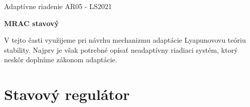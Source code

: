 \documentclass[a4paper, 10pt, ]{article}
\def\oznacenieCasti{AR05 - LS2021}
\begin{document}
\lstset{%
style=mystyle,
rangebeginprefix=\#\#\#\ cellB\ ,%
rangebeginsuffix=\ \#\#\#,%
rangeendprefix=\#\#\#\ cellE\ ,%
rangeendsuffix=\ \#\#\#,%
includerangemarker=false,
}




\fontsize{12pt}{22pt}\selectfont

\centerline{\textsf{Adaptívne riadenie} \hfill \textsf{\oznacenieCasti}}

\fontsize{18pt}{22pt}\selectfont





\begin{flushleft}
    \textbf{\textsf{MRAC stavový}}
\end{flushleft}





\normalsize

\bigskip

{\hypersetup{hidelinks}

\tableofcontents

}

\bigskip

\vspace{18pt}






\noindent
\lettrine[lines=3, nindent=0pt]{V}{} tejto časti využijeme pri návrhu mechanizmu adaptácie Lyapunovovu teóriu stability. Najprv je však potrebné opísať neadaptívny riadiaci systém, ktorý neskôr doplníme zákonom adaptácie.












\section{Stavový regulátor}
\label{Stavový regulátor ($n=2$)}
\end{document}
